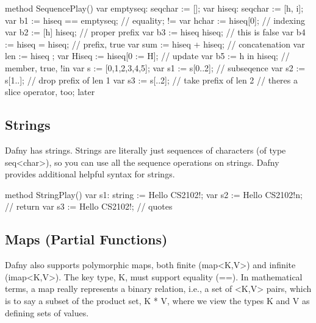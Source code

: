 \documentclass[letterpaper,10pt,english]{sphinxmanual}
\begin{document}
\begin{sphinxVerbatim}[commandchars=\\\{\}]
method SequencePlay()
\PYGZob{}
    var empty\PYGZus{}seq: seq\PYGZlt{}char\PYGZgt{} := [];
    var hi\PYGZus{}seq: seq\PYGZlt{}char\PYGZgt{} := [\PYGZsq{}h\PYGZsq{}, \PYGZsq{}i\PYGZsq{}];
    var b1 := hi\PYGZus{}seq == empty\PYGZus{}seq; // equality; !=
    var hchar := hi\PYGZus{}seq[0];        // indexing
    var b2 := [\PYGZsq{}h\PYGZsq{}] \PYGZlt{} hi\PYGZus{}seq;   // proper prefix
    var b3 := hi\PYGZus{}seq \PYGZlt{} hi\PYGZus{}seq;  // this is false
    var b4 := hi\PYGZus{}seq \PYGZlt{}= hi\PYGZus{}seq; // prefix, true
    var sum := hi\PYGZus{}seq + hi\PYGZus{}seq; // concatenation
    var len := \textbar{} hi\PYGZus{}seq \textbar{};
    var Hi\PYGZus{}seq := hi\PYGZus{}seq[0 := \PYGZsq{}H\PYGZsq{}]; // update
    var b5 := \PYGZsq{}h\PYGZsq{} in hi\PYGZus{}seq; // member, true, !in
    var s := [0,1,2,3,4,5];
    var s1 := s[0..2];  // subseqence
    var s2 := s[1..];   // \PYGZdq{}drop\PYGZdq{} prefix of len 1
    var s3 := s[..2];   // \PYGZdq{}take\PYGZdq{} prefix of len 2
    // there\PYGZsq{}s a slice operator, too; later
 \PYGZcb{}
\end{sphinxVerbatim}


\subsection{Strings}
\label{\detokenize{06-dafny-language:strings}}
Dafny has strings. Strings are literally just sequences of characters
(of type seq\textless{}char\textgreater{}), so you can use all the sequence operations on
strings.  Dafny provides additional helpful syntax for strings.

\begin{sphinxVerbatim}[commandchars=\\\{\}]
method StringPlay()
 \PYGZob{}
     var s1: string := \PYGZdq{}Hello CS2102!\PYGZdq{};
     var s2 := \PYGZdq{}Hello CS2102!\PYGZbs{}n\PYGZdq{};   // return
     var s3 := \PYGZdq{}\PYGZbs{}\PYGZdq{}Hello CS2102!\PYGZbs{}\PYGZdq{}\PYGZdq{}; // quotes
 \PYGZcb{}
\end{sphinxVerbatim}


\subsection{Maps (Partial Functions)}
\label{\detokenize{06-dafny-language:maps-partial-functions}}
Dafny also supports polymorphic maps, both finite (map\textless{}K,V\textgreater{}) and
infinite (imap\textless{}K,V\textgreater{}).  The key type, K, must support equality (==).
In mathematical terms, a map really represents a binary relation,
i.e., a set of \textless{}K,V\textgreater{} pairs, which is to say a subset of the product
set, K * V, where we view the types K and V as defining sets of
values.
\end{document}
